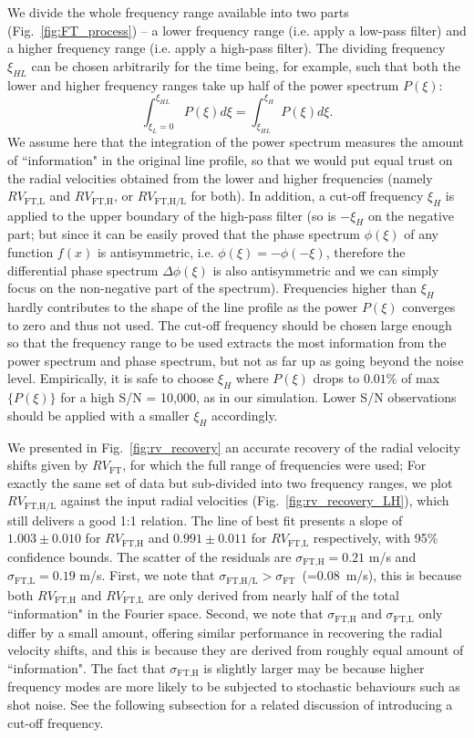 We divide the whole frequency range available into two parts (Fig.~\ref{fig:FT_process}) -- a lower frequency range (i.e. apply a low-pass filter) and a higher frequency range (i.e. apply a high-pass filter). The dividing frequency $\xi_{HL}$ can be chosen arbitrarily for the time being, for example, such that both the lower and higher frequency ranges take up half of the power spectrum $P(\xi)$:
\begin{equation}
	\int_{\xi_{L}=0}^{\xi_{HL}} P(\xi) d\xi = \int_{\xi_{HL}}^{\xi_{H}} P(\xi) d\xi. 
\end{equation}
We assume here that the integration of the power spectrum measures the amount of ``information" in the original line profile, so that we would put equal trust on the radial velocities obtained from the lower and higher frequencies (namely $RV_\text{FT,L}$ and $RV_\text{FT,H}$, or $RV_\text{FT,H/L}$ for both). In addition, a cut-off frequency $\xi_{H}$ is applied to the upper boundary of the high-pass filter (so is $-\xi_{H}$ on the negative part; but since it can be easily proved that the phase spectrum $\phi(\xi)$ of any function $f(x)$ is antisymmetric, i.e. $\phi(\xi) = -\phi(-\xi)$, therefore the differential phase spectrum $\Delta \phi(\xi)$ is also antisymmetric and we can simply focus on the non-negative part of the spectrum). Frequencies higher than $\xi_{H}$ hardly contributes to the shape of the line profile as the power $P(\xi)$ converges to zero and thus not used. The cut-off frequency should be chosen large enough so that the frequency range to be used extracts the most information from the power spectrum and phase spectrum, but not as far up as going beyond the noise level. Empirically, it is safe to choose $\xi_{H}$ where $P(\xi)$ drops to $0.01\%$ of max$\{P(\xi)\}$ for a high S/N = 10,000, as in our simulation. Lower S/N observations should be applied with a smaller $\xi_{H}$ accordingly. 

We presented in Fig.~\ref{fig:rv_recovery} an accurate recovery of the radial velocity shifts given by $RV_\text{FT}$, for which the full range of frequencies were used; For exactly the same set of data but sub-divided into two frequency ranges, we plot $RV_\text{FT,H/L}$ against the input radial velocities (Fig.~\ref{fig:rv_recovery_LH}), which still delivers a good 1:1 relation. The line of best fit presents a slope of $1.003\pm0.010$ for $RV_\text{FT,H}$ and $0.991\pm0.011$ for $RV_\text{FT,L}$ respectively, with 95\% confidence bounds. The scatter of the residuals are $\sigma_\text{FT,H} = 0.21$ m/s and $\sigma_\text{FT,L} = 0.19$ m/s. First, we note that $\sigma_\text{FT,H/L} > \sigma_\text{FT}$~(=0.08~m/s), this is because both $RV_\text{FT,H}$ and $RV_\text{FT,L}$ are only derived from nearly half of the total ``information" in the Fourier space. Second, we note that $\sigma_\text{FT,H}$ and $\sigma_\text{FT,L}$ only differ by a small amount, offering similar performance in recovering the radial velocity shifts, and this is because they are derived from roughly equal amount of ``information". The fact that $\sigma_\text{FT,H}$ is slightly larger may be because higher frequency modes are more likely to be subjected to stochastic behaviours such as shot noise. See the following subsection for a related discussion of introducing a cut-off frequency.


